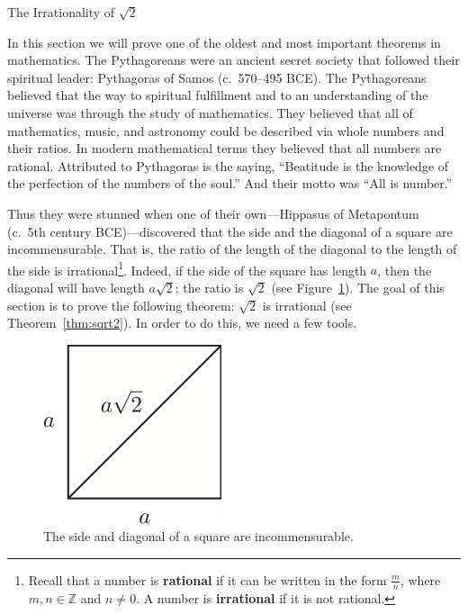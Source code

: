 \begin{section}{The Irrationality of $\sqrt{2}$}

In this section we will prove one of the oldest and most important theorems in mathematics. The Pythagoreans were an ancient secret society that followed their spiritual leader: Pythagoras of Samos (c.\ 570--495 BCE). The Pythagoreans believed that the way to spiritual fulfillment and to an understanding of the universe was through the study of mathematics. They believed that all of mathematics, music, and astronomy could be described via whole numbers and their ratios. In modern mathematical terms they believed that all numbers are rational. Attributed to Pythagoras is the saying, ``Beatitude is the knowledge of the perfection of the numbers of the soul.'' And their motto was ``All is number.''

Thus they were stunned when one of their own---Hippasus of Metapontum (c.\ 5th century BCE)---discovered that the side and the diagonal of a square are incommensurable. That is, the ratio of the length of the diagonal to the length of the side is irrational\footnote{Recall that a number is \textbf{rational} if it can be written in the form $\frac{m}{n}$, where $m,n\in\mathbb{Z}$ and $n\neq 0$.  A number is \textbf{irrational} if it is not rational.}. Indeed, if the side of the square has length $a$, then the diagonal will have length $a\sqrt{2}$; the ratio is $\sqrt{2}$ (see Figure~\ref{fig:square}).  The goal of this section is to prove the following theorem: $\sqrt{2}$ is irrational (see Theorem~\ref{thm:sqrt2}). In order to do this, we need a few tools. 

\begin{figure}[ht]
\begin{center}
\includegraphics{square.png}
\end{center}
\vspace{-.5cm}
\caption{The side and diagonal of a square are incommensurable.}
\label{fig:square}
\end{figure}


\end{section}
